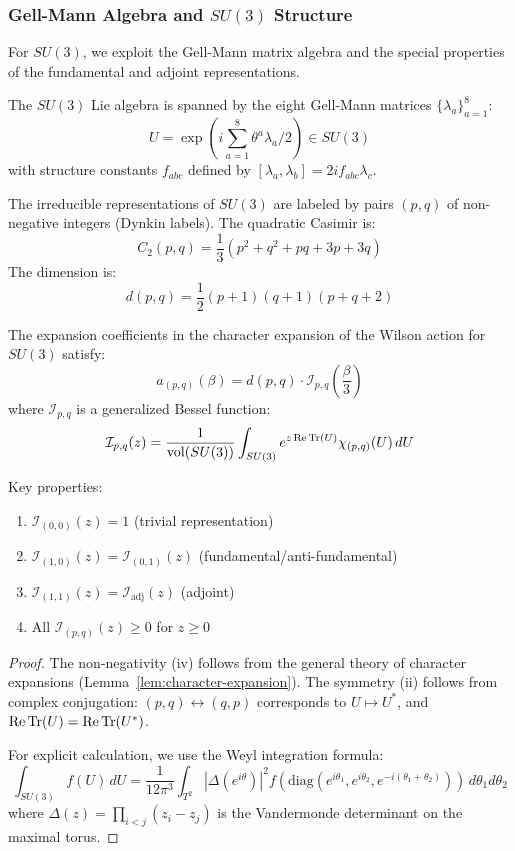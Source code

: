 \subsubsection{Gell-Mann Algebra and $SU(3)$ Structure}

For $SU(3)$, we exploit the Gell-Mann matrix algebra and the special properties 
of the fundamental and adjoint representations.

\begin{definition}
The $SU(3)$ Lie algebra is spanned by the eight Gell-Mann matrices $\{\lambda_a\}_{a=1}^8$:
\[
U = \exp\left(i\sum_{a=1}^8 \theta^a \lambda_a/2\right) \in SU(3)
\]
with structure constants $f_{abc}$ defined by $[\lambda_a, \lambda_b] = 2if_{abc}\lambda_c$.
\end{definition}

\begin{theorem}
\label{thm:su3-casimir}
The irreducible representations of $SU(3)$ are labeled by pairs $(p,q)$ of 
non-negative integers (Dynkin labels). The quadratic Casimir is:
\[
C_2(p,q) = \frac{1}{3}(p^2 + q^2 + pq + 3p + 3q)
\]
The dimension is:
\[
d(p,q) = \frac{1}{2}(p+1)(q+1)(p+q+2)
\]
\end{theorem}

\begin{theorem}
\label{thm:su3-characters}
The expansion coefficients in the character expansion of the Wilson action 
for $SU(3)$ satisfy:
\[
a_{(p,q)}(\beta) = d(p,q) \cdot \mathcal{I}_{p,q}\left(\frac{\beta}{3}\right)
\]
where $\mathcal{I}_{p,q}$ is a generalized Bessel function:
\[
\mathcal{I}_{p,q}(z) = \frac{1}{\text{vol}(SU(3))} \int_{SU(3)} e^{z\operatorname{Re}\operatorname{Tr}(U)} \chi_{(p,q)}(U) \, dU
\]

Key properties:
\begin{enumerate}[label=(\roman*)]
\item $\mathcal{I}_{(0,0)}(z) = 1$ (trivial representation)
\item $\mathcal{I}_{(1,0)}(z) = \mathcal{I}_{(0,1)}(z)$ (fundamental/anti-fundamental)
\item $\mathcal{I}_{(1,1)}(z) = \mathcal{I}_{\text{adj}}(z)$ (adjoint)
\item All $\mathcal{I}_{(p,q)}(z) \geq 0$ for $z \geq 0$
\end{enumerate}
\end{theorem}

\begin{proof}
The non-negativity (iv) follows from the general theory of character expansions 
(Lemma~\ref{lem:character-expansion}). The symmetry (ii) follows from complex 
conjugation: $(p,q) \leftrightarrow (q,p)$ corresponds to $U \mapsto U^*$, and 
$\operatorname{Re}\operatorname{Tr}(U) = \operatorname{Re}\operatorname{Tr}(U^*)$.

For explicit calculation, we use the Weyl integration formula:
\[
\int_{SU(3)} f(U) \, dU = \frac{1}{12\pi^3} \int_{T^2} |\Delta(e^{i\theta})|^2 f(\text{diag}(e^{i\theta_1}, e^{i\theta_2}, e^{-i(\theta_1+\theta_2)})) \, d\theta_1 d\theta_2
\]
where $\Delta(z) = \prod_{i<j}(z_i - z_j)$ is the Vandermonde determinant on the maximal torus.
\end{proof}

